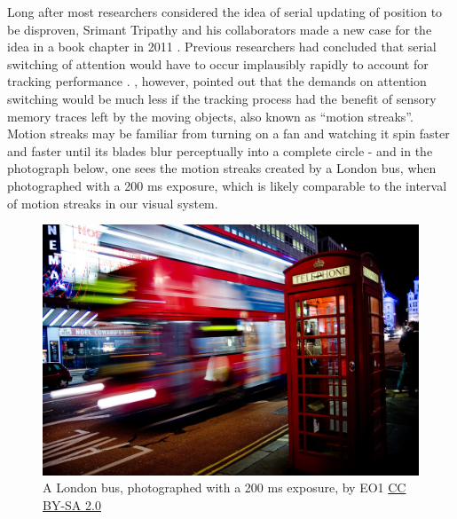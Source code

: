 \documentclass[
]{book}
\begin{document}
Long after most researchers considered the idea of serial updating of position to be disproven, Srimant Tripathy and his collaborators made a new case for the idea in a book chapter in 2011 \citep{tripathyMultipleObjectTrackingSerial2011}. Previous researchers had concluded that serial switching of attention would have to occur implausibly rapidly to account for tracking performance \citep{pylyshynTrackingMultipleIndependent1988, yantisMultielementVisualTracking1992, oksamaMultipleObjectTracking2004}. \citet{tripathyMultipleObjectTrackingSerial2011}, however, pointed out that the demands on attention switching would be much less if the tracking process had the benefit of sensory memory traces left by the moving objects, also known as ``motion streaks''. Motion streaks may be familiar from turning on a fan and watching it spin faster and faster until its blades blur perceptually into a complete circle - and in the photograph below, one sees the motion streaks created by a London bus, when photographed with a 200 ms exposure, which is likely comparable to the interval of motion streaks in our visual system.



\begin{figure}
\includegraphics[width=0.8\linewidth]{imagesForRmd/motionBlur/London_bus_and_telephone_box_on_Haymarket} \caption{A London bus, photographed with a 200 ms exposure, by EO1 \href{https://creativecommons.org/licenses/by-sa/2.0/deed.en}{CC BY-SA 2.0}}\label{fig:busMotionBlur}
\end{figure}
\end{document}
